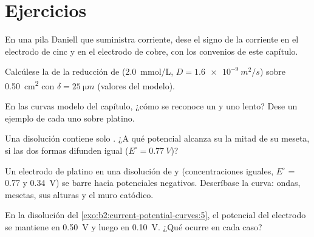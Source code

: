 \section{Ejercicios}

\begin{exercise}[$\star$]\label{exo:b2:current-potential-curves:1}
En una pila Daniell que suministra corriente, dese el signo de la corriente en el
electrodo de cinc y en el electrodo de cobre, con los convenios de este
capítulo.
\end{exercise}

\begin{exercise}[$\star$]\label{exo:b2:current-potential-curves:2}
Calcúlese la  de la reducción de  (\qty{2.0}{mmol/L}, $D =
\qty{1.6e-9}{m^2/s}$) sobre \qty{0.50}{cm^2} con $\delta = \qty{25}{\micro m}$
(valores del modelo).
\end{exercise}

\begin{exercise}[$\star$]\label{exo:b2:current-potential-curves:3}
En las curvas modelo del capítulo, ¿cómo se reconoce un  y uno
lento? Dese un ejemplo de cada uno sobre platino.
\end{exercise}

\begin{exercise}[$\star$]\label{exo:b2:current-potential-curves:4}
Una disolución contiene solo . ¿A qué potencial alcanza su 
la mitad de su meseta, si las dos formas difunden igual ($E^\circ = \qty{0.77}{V}$)?
\end{exercise}

\begin{exercise}[$\star\star$]\label{exo:b2:current-potential-curves:5}
Un electrodo de platino en una disolución de  y  (concentraciones
iguales, $E^\circ$ = 0.77 y \qty{0.34}{V}) se barre hacia potenciales
negativos. Descríbase la curva: ondas, mesetas, sus alturas y el muro
catódico.
\end{exercise}

\begin{exercise}[$\star\star$]\label{exo:b2:current-potential-curves:6}
En la disolución del \cref{exo:b2:current-potential-curves:5}, el potencial del
electrodo se mantiene en \qty{0.50}{V} y luego en \qty{0.10}{V}. ¿Qué ocurre en
cada caso?
\end{exercise}

